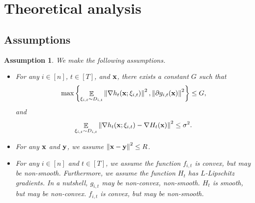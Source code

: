 \documentclass{article}
\newtheorem{Assumption}{\bf{Assumption}}
\begin{document}
\section{Theoretical analysis}


\subsection{Assumptions}
\begin{Assumption}
\label{assumption_bounded_gradient_domain}
We make the following assumptions.
\begin{itemize}
\item For any $i\in[n]$, $t\in[T]$, and ${\bf x}$, there exists a constant $G$ such that
\begin{align}
\nonumber
\max\left\{ \mathop{\mathbb{E}}_{ \xi_{i,t} \sim D_{i,t} }\left\lVert\nabla h_t({\bf x};\xi_{i,t})\right\rVert^2,  \left\lVert\partial g_{i,t}({\bf x})\right\rVert^2 \right\} \le G,
\end{align} and 
\begin{align}
\nonumber
\mathop{\mathbb{E}}_{ \xi_{i,t} \sim D_{i,t} } \left\lVert\nabla h_t({\bf x}; \xi_{i,t}) - \nabla H_t({\bf x})\right\rVert^2 \le \sigma^2.
\end{align}
\item For any ${\bf x}$ and ${\bf y}$, we assume $\left\lVert{\bf x}-{\bf y}\right\rVert^2 \le R$.
\item {\color{red} For any $i\in[n]$ and $t\in[T]$, we assume the function $f_{i,t}$ is convex, but may be non-smooth. Furthermore, we assume the function $H_t$ has  $L$-Lipschitz gradients. In a nutshell, $g_{i,t}$ may be non-convex, non-smooth. $H_t$ is smooth, but may be non-convex. $f_{i,t}$ is convex, but may be non-smooth.}
\end{itemize}
\end{Assumption}



%
\end{document}
